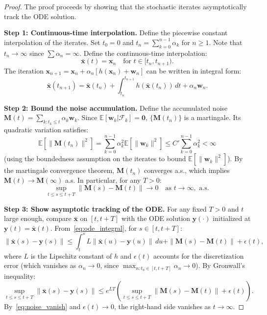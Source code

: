 \documentclass[11pt,a4paper]{article}
\theoremstyle{definition}
\theoremstyle{plain}
\theoremstyle{remark}
\newcommand{\E}{\mathbb{E}}
\begin{document}
\begin{proof}
The proof proceeds by showing that the stochastic iterates asymptotically track the ODE solution.

\textbf{Step 1: Continuous-time interpolation.} Define the piecewise constant interpolation of the iterates. Set $t_0 = 0$ and $t_n = \sum_{k=0}^{n-1}\alpha_k$ for $n \geq 1$. Note that $t_n \to \infty$ since $\sum\alpha_n = \infty$. Define the continuous-time interpolation:
\begin{equation}
    \bar{\bm{x}}(t) = \bm{x}_n \quad \text{for } t \in [t_n, t_{n+1}).
\end{equation}
The iteration $\bm{x}_{n+1} = \bm{x}_n + \alpha_n[h(\bm{x}_n) + \bm{w}_n]$ can be written in integral form:
\begin{equation}
    \bar{\bm{x}}(t_{n+1}) = \bar{\bm{x}}(t_n) + \int_{t_n}^{t_{n+1}} h(\bar{\bm{x}}(t_n))\,dt + \alpha_n\bm{w}_n.
    \label{eq:ode_integral}
\end{equation}

\textbf{Step 2: Bound the noise accumulation.} Define the accumulated noise $\bm{M}(t) = \sum_{k: t_k \leq t} \alpha_k \bm{w}_k$. Since $\E[\bm{w}_k | \mathcal{F}_k] = \bm{0}$, $\{\bm{M}(t_n)\}$ is a martingale. Its quadratic variation satisfies:
\begin{equation}
    \E[\|\bm{M}(t_n)\|^2] = \sum_{k=0}^{n-1}\alpha_k^2\E[\|\bm{w}_k\|^2] \leq C'\sum_{k=0}^{n-1}\alpha_k^2 < \infty
    \label{eq:noise_qv}
\end{equation}
(using the boundedness assumption on the iterates to bound $\E[\|\bm{w}_k\|^2]$). By the martingale convergence theorem, $\bm{M}(t_n)$ converges a.s., which implies $\bm{M}(t) \to \bm{M}(\infty)$ a.s. In particular, for any $T > 0$:
\begin{equation}
    \sup_{t \leq s \leq t+T}\|\bm{M}(s) - \bm{M}(t)\| \to 0 \quad \text{as } t \to \infty, \text{ a.s.}
    \label{eq:noise_vanish}
\end{equation}

\textbf{Step 3: Show asymptotic tracking of the ODE.} For any fixed $T > 0$ and $t$ large enough, compare $\bar{\bm{x}}$ on $[t, t+T]$ with the ODE solution $\bm{y}(\cdot)$ initialized at $\bm{y}(t) = \bar{\bm{x}}(t)$. From~\eqref{eq:ode_integral}, for $s \in [t, t+T]$:
\begin{equation}
    \|\bar{\bm{x}}(s) - \bm{y}(s)\| \leq \int_t^s L\|\bar{\bm{x}}(u) - \bm{y}(u)\|\,du + \|\bm{M}(s) - \bm{M}(t)\| + \epsilon(t),
\end{equation}
where $L$ is the Lipschitz constant of $h$ and $\epsilon(t)$ accounts for the discretization error (which vanishes as $\alpha_n \to 0$, since $\max_{n: t_n \in [t,t+T]} \alpha_n \to 0$). By Gronwall's inequality:
\begin{equation}
    \sup_{t \leq s \leq t+T}\|\bar{\bm{x}}(s) - \bm{y}(s)\| \leq e^{LT}\!\left(\sup_{t \leq s \leq t+T}\|\bm{M}(s) - \bm{M}(t)\| + \epsilon(t)\right).
    \label{eq:gronwall}
\end{equation}
By~\eqref{eq:noise_vanish} and $\epsilon(t) \to 0$, the right-hand side vanishes as $t \to \infty$.


\end{proof}
\end{document}
